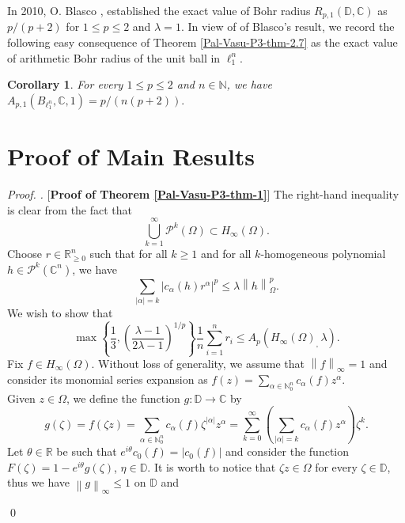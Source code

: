 \documentclass[a4paper,12pt]{amsart}
\newtheorem{cor}[equation]{Corollary}
\theoremstyle{definition}
\newenvironment{pf}[1][]{%
 \vskip 3mm
 \noindent
 \ifthenelse{\equal{#1}{}}%
  {{\slshape Proof. }}%
  {{\slshape #1.} }%
 }%
{\qed\bigskip}
\newcommand{\norm}[1]{\left\lVert#1\right\rVert}
\begin{document}
In 2010, O. Blasco \cite[Proposition 1.4]{Blasco-OTAA-2010}, established the exact value of Bohr radius $R_{p,1}(\mathbb{D},\mathbb{C})$ as $p/(p+2)$ for $1\leq p\leq 2$ and $\lambda=1$. In view of of Blasco's result, we record the following easy consequence of Theorem \ref{Pal-Vasu-P3-thm-2.7} as the exact value of arithmetic Bohr radius of the unit ball in $\ell^n_{1}$.

\begin{cor}
	For every $1\leq p\leq 2$ and $n\in \mathbb{N}$, we have $A_{p,1}(B_{\ell^n_{1}},\mathbb{C},1)=p/(n(p+2)).$
\end{cor}
\section{Proof of Main Results}
\begin{pf} [{\bf Proof of Theorem \ref{Pal-Vasu-P3-thm-1}}]
	The right-hand inequality is clear from the fact that 
	\begin{equation*}
		\bigcup_{k=1}^{\infty} \mathcal{P}^{k}(\Omega) \subset H_{\infty} (\Omega).
	\end{equation*}
	Choose $r\in \mathbb{R}^n_{\geq 0}$ such that for all $k\geq 1$ and for all $k$-homogeneous polynomial $h \in \mathcal{P}^k(\mathbb{C}^n)$, we have
	\begin{equation}\label{Pal-Vasu-P3-e-3.1}
		\sum_{|\alpha|=k} |c_{\alpha}(h)r^{\alpha}|^p \leq \lambda \norm{h}^p_{\Omega}.
	\end{equation}
	We wish to show that 
	\begin{equation}\label{Pal-Vasu-P3-e-3.2}
		\max \left\{\frac{1}{3}, \left(\frac{\lambda-1}{2\lambda-1}\right)^{1/p}\right\}\frac{1}{n}\sum_{i=1}^{n}r_i \leq A_p(H_{\infty}(\Omega)_,\, \lambda).
	\end{equation}
	Fix $f \in H_{\infty}(\Omega)$. Without loss of generality, we assume that $\norm{f}_{\infty}=1$ and consider its monomial series expansion as $f(z)=\sum_{\alpha\in \mathbb{N}^n_{0}}c_{\alpha}(f)z^{\alpha}$.\\[2mm]
	Given $z\in \Omega$, we define the function $g: \mathbb{D}\rightarrow \mathbb{C}$ by
	\begin{equation*}
		g(\zeta)=f(\zeta z)=\sum_{\alpha\in \mathbb{N}^n_{0}}c_{\alpha}(f)\zeta^{|\alpha|}z^{\alpha}=\sum_{k=0}^{\infty}\left(\sum_{|\alpha|=k}c_{\alpha}(f)z^{\alpha}\right)\zeta^{k}.
	\end{equation*}
	Let $\theta \in \mathbb{R}$ be such that $e^{i\theta}c_{0}(f)=|c_0(f)|$ and consider the function $F(\zeta)=1-e^{i\theta}g(\zeta)$, $\eta \in \mathbb{D}$. It is worth to notice that $\zeta z\in \Omega$ for every $\zeta \in \mathbb{D}$, thus we have $\norm{g}_{\infty}\leq 1$ on $\mathbb{D}$ and 

\end{pf}
\end{document}
